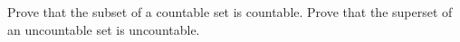   Prove that the subset of a countable set is countable.
  Prove that the superset of an uncountable set is uncountable.
